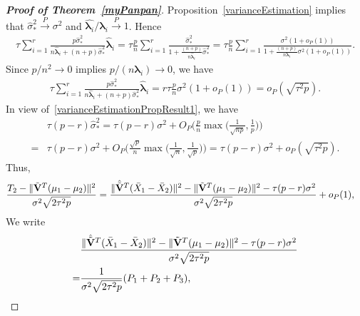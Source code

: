 \documentclass[review]{elsarticle}
\newcommand{\bfsym}[1]{\ensuremath{\boldsymbol{#1}}}
\def\blambda {\bfsym {\lambda}}        \def\bLambda {\bfsym {\Lambda}}
\theoremstyle{plain}
\theoremstyle{definition}
\theoremstyle{remark}
\begin{document}
\begin{appendices}
\begin{proof}[\textbf{Proof of Theorem~\ref{myPanpan}}]
    Proposition~\ref{varianceEstimation} implies that $\hat{\sigma}_{*}^2\xrightarrow{P} \sigma^2$ and $\hat{\blambda_i}/\blambda_i\xrightarrow{P} 1$.
    Hence
    $$
    \begin{aligned} 
 \tau\sum_{i=1}^r \frac{p\hat{\sigma}_*^2}{n\hat{\blambda}_i+(n+p)\hat{\sigma}_*^2}\hat{\blambda}_i
        =
        \tau\frac{p}{n}\sum_{i=1}^r \frac{\hat{\sigma}_*^2}{1+\frac{(n+p)}{n\hat{\blambda}_i}\hat{\sigma}_*^2}
        =
        \tau\frac{p}{n}\sum_{i=1}^r \frac{\sigma^2(1+o_P(1))}{1+\frac{(n+p)}{n\blambda_i}\sigma^2(1+o_P(1))}.
    \end{aligned}
    $$
    Since $p/n^2\to 0$ implies $p/(n\blambda_i)\to 0$, we have
    $$
    \begin{aligned} 
 \tau\sum_{i=1}^r \frac{p\hat{\sigma}_*^2}{n\hat{\blambda}_i+(n+p)\hat{\sigma}_*^2}\hat{\blambda}_i
        =r\tau \frac{p}{n} \sigma^2(1+o_P(1))=o_P(\sqrt{\tau^2 p}).
    \end{aligned}
    $$
    In view of~\eqref{varianceEstimationPropResult1}, we have
    $$
    \begin{aligned}
        &\tau(p-r)\hat{\sigma}_*^2 =
    \tau(p-r)\sigma^2 + O_P\Big(\frac{p}{n}\max\big(\frac{1}{\sqrt{np}},\frac{1}{p}\big)\Big)\\
        =&
        \tau(p-r)\sigma^2 + O_P\Big(\frac{\sqrt{p}}{n}\max\big(\frac{1}{\sqrt{n}},\frac{1}{\sqrt{p}}\big)\Big)
        =\tau(p-r)\sigma^2 + o_P(\sqrt{\tau^2 p}).
    \end{aligned}
    $$
Thus,
\begin{equation*}
    \begin{aligned}
        &\frac{T_2-\|\tilde{\mathbf{V}}^T(\mu_1-\mu_2)\|^2}{\sigma^2\sqrt{2\tau^2 p}}
        =
        \frac{\|\hat{\tilde{\mathbf{V}}}^T(\bar{X}_1-\bar{X}_2)\|^2-\|\tilde{\mathbf{V}}^T(\mu_1-\mu_2)\|^2
        -\tau (p-r)\sigma^2
        }{\sigma^2\sqrt{2\tau^2 p}}+o_P(1),
    \end{aligned}
\end{equation*}
    We write
\begin{equation*}
    \begin{aligned}
        &\frac{\|\hat{\tilde{\BV}}^T(\bar{X}_1-\bar{X}_2)\|^2-\|\tilde{\BV}^T(\mu_1-\mu_2)\|^2
        -\tau (p-r)\sigma^2
        }{\sigma^2\sqrt{2\tau^2 p}}
        \\
        =&\frac{1}{\sigma^2\sqrt{2\tau^2 p}}(
        P_1+P_2+P_3
        ),
    \end{aligned}

\end{equation*}
\end{proof}
\end{appendices}
\end{document}
